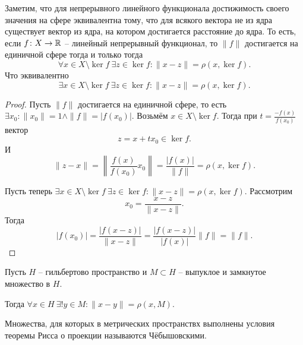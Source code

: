 \begin{note}
    Заметим, что для непрерывного линейного функционала достижимость своего значения на сфере эквивалентна тому, что для всякого вектора не из ядра существует вектор из ядра, на котором достигается расстояние до ядра.
    То есть, если $f\colon X \to \mathbb{R}$ -- линейный непрерывный функционал, то $\|f\|$ достигается на единичной сфере тогда и только тогда
    \[
        \forall x \in X \setminus \ker f \ \exists z \in \ker f\colon \|x - z\| = \rho(x, \ker f).
    \]
    Что эквивалентно
    \[
        \exists x \in X \setminus \ker f \ \exists z \in \ker f\colon \|x - z\| = \rho(x, \ker f).
    \]
    \begin{proof}
        Пусть $\|f\|$ достигается на единичной сфере, то есть $\exists x_0\colon \|x_0\| = 1 \wedge \|f\| = |f(x_0)|$.
        Возьмём $x \in X \setminus \ker f$.
        Тогда при $t = \frac{-f(x)}{f(x_0)}$ вектор
        \[
           z = x + t x_0 \in \ker f.
        \]
        И
        \[
            \|z - x\| = \left\|\frac{f(x)}{f(x_0)}x_0\right\| = \frac{|f(x)|}{\|f\|} = \rho(x, \ker f).
        \]

        Пусть теперь $\exists x \in X \setminus \ker f \ \exists z \in \ker f \colon \|x - z\| = \rho(x, \ker f)$.
        Рассмотрим
        \[
            x_0 = \frac{x - z}{\|x - z\|}.
        \]
        Тогда
        \[
            |f(x_0)| = \frac{|f(x - z)|}{\|x - z\|} = \frac{|f(x - z)|}{|f(x)|}\|f\| = \|f\|.
        \]
    \end{proof}
\end{note}
\begin{theorem}
    Пусть $H$ -- гильбертово пространство и $M \subset H$ -- выпуклое и замкнутое множество в $H$.

    Тогда $\forall x \in H \ \exists ! y \in M\colon \|x - y\| = \rho(x, M)$.
\end{theorem}
\begin{note}
    Множества, для которых в метрических пространствх выполнены условия теоремы Рисса о проекции называются Чёбышовскими.
\end{note}
